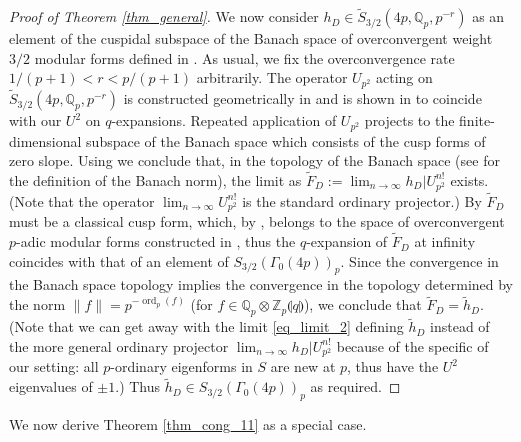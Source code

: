 \documentclass[11pt,letterpaper]{amsart}
\newcommand{\Z}{{\mathbb Z}}
\newcommand{\Q}{{\mathbb Q}}
\DeclareMathOperator{\ord}{ord}
\theoremstyle{remark}
\begin{document}
\begin{proof}[Proof of Theorem \ref{thm_general}]
We now consider $h_D \in \tilde{S}_{3/2}   (4p, \Q_p, p^{-r})$ as an element of the 
cuspidal subspace of the Banach space of overconvergent weight $3/2$ modular forms  defined in \cite{Ramsey}. 
As usual, we fix the overconvergence rate $1/(p+1) < r < p/(p+1)$ arbitrarily.
The operator $U_{p^2}$ acting on $\tilde{S}_{3/2}   (4p, \Q_p, p^{-r})$ is constructed geometrically in \cite[Section 5]{Ramsey} and is shown in \cite[Proposition 5.5]{Ramsey} to coincide with our $U^2$ on $q$-expansions. Repeated application of $U_{p^2}$ projects to the finite-dimensional subspace of the Banach space which consists of the cusp forms of zero slope. 
Using \cite[Lemma 7.2.1]{Hida_book} we conclude that, 
 in the topology of the Banach space (see \cite[Section 2.2]{Ramsey} for the definition of the Banach norm), the limit as $\tilde{F}_D:= \lim_{n \rightarrow \infty} h_D|U_{p^2}^{n!}$  exists. 
 (Note that  the operator $\lim_{n \rightarrow \infty} U_{p^2}^{n!}$ is  the standard ordinary projector.) 
 By  \cite[Theorem 6.1]{Ramsey} $\tilde{F}_D$ must be a classical cusp form, which, by \cite[Proposition 6.2]{Ramsey}, belongs to the space of overconvergent $p$-adic modular forms constructed in \cite{Ramsey2006}, thus the $q$-expansion of $\tilde{F}_D$ at infinity coincides with that of an element of $S_{3/2}(\Gamma_0(4p))_p$. 
Since the convergence in the Banach space topology implies the convergence in the topology determined by the norm $\lVert f \rVert = p^{-\ord_p (f)}$ (for $f \in \Q_p \otimes \Z_p\llparenthesis q \rrparenthesis$), we conclude that  $\tilde{F}_D = \tilde{h}_D$. (Note that we can get away with the limit \eqref{eq_limit_2} defining $\tilde{h}_D$ 
instead of the more general ordinary projector $\lim_{n \rightarrow \infty} h_D| U_{p^2}^{n!}$ because of the specific of our setting: all $p$-ordinary eigenforms in $S$  are new at  $p$, thus have the $U^2$ eigenvalues of $\pm1$.) 
Thus $\tilde{h}_D \in S_{3/2}(\Gamma_0(4p))_p$ as required.
\end{proof}






We now derive Theorem \ref{thm_cong_11} as a special case.
\end{document}
